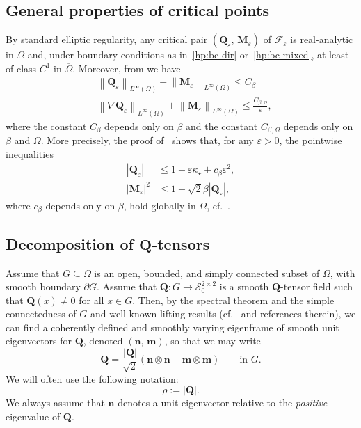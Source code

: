 \documentclass[a4paper, 11pt, twoside, leqno]{article}
\theoremstyle{definition}              %
\theoremstyle{remark}                  %
\newcommand{\abs}[1]{\left| #1 \right|}                             %
\newcommand{\norm}[1]{\left\| #1 \right\|}                          %
\newcommand{\Q}{\mathbf{Q}}
\newcommand{\M}{\mathbf{M}}
\newcommand{\n}{\mathbf{n}}
\newcommand{\m}{\mathbf{m}}
\newcommand{\F}{\mathscr{F}}
\newcommand{\eps}{\varepsilon}
\newcommand{\Sz}{\mathscr{S}_0^{2\times 2}}
\begin{document}
\subsection{General properties of critical points}
By standard elliptic regularity,
any critical pair $(\Q_\eps,\,\M_\eps)$ of $\F_\eps$ is 
real-analytic in $\Omega$ and, under boundary conditions 
as in~\eqref{hp:bc-dir} or~\eqref{hp:bc-mixed}, at least 
of class $C^1$ in $\overline{\Omega}$.
Moreover, from \cite[Lemma~1.6]{CDS1} we have
\begin{align}
    & \norm{\Q_\eps}_{L^\infty(\Omega)} + \norm{\M_\eps}_{L^\infty(\Omega)} \leq C_\beta \label{eq:max-QM} \\
    & \norm{\nabla \Q_\eps}_{L^\infty(\Omega)} + \norm{\M_\eps}_{L^\infty(\Omega)} \leq \frac{C_{\beta,\Omega}}{\eps}\label{eq:max-grad-QM},
\end{align}
where the constant $C_\beta$ depends only on $\beta$ and 
the constant $C_{\beta,\Omega}$ depends only on $\beta$ and $\Omega$. 
More precisely, the proof of~\cite[Lemma~1.6]{CDS1} shows that, 
for any $\eps > 0$, the pointwise inequalities
\begin{align}
    \abs{\Q_\eps} &\leq 1 + \eps \kappa_\star + c_\beta \eps^2, \label{eq:max-princ-rho} \\
    \abs{\M_\eps}^2 &\leq 1 + \sqrt{2}\beta \abs{\Q_\eps} \label{eq:max-princ-M},
\end{align}
where $c_\beta$ depends only on $\beta$, hold globally in $\Omega$, cf.~\cite[Lemma~1.6 and Remark~1.7]{CDS1}.  


\subsection{Decomposition of $\Q$-tensors}\label{sec:dec-Q}
Assume that $G \subseteq \Omega$ is an open, bounded, 
and simply connected subset of $\Omega$, with smooth 
boundary $\partial G$. Assume that $\Q : G \to \Sz$ 
is a smooth $\Q$-tensor field such that $\Q(x) \neq 0$ 
for all $x \in G$. Then, by the spectral theorem and 
the simple connectedness of $G$ and well-known lifting 
results (cf.~\cite{CDS1} and references therein), we can find a coherently 
defined and smoothly varying eigenframe of smooth unit 
eigenvectors for $\Q$, denoted $(\n,\,\m)$, so that we may write
\begin{equation}\label{eq:spectral-thm}
    \Q = \frac{\abs{\Q}}{\sqrt{2}} \left( \n \otimes \n - \m \otimes \m \right) 
    \qquad \mbox{in } G.
\end{equation}
We will often use the following notation:
\[
    \rho := \abs{\Q}.
\]
We always assume that $\n$ denotes a unit eigenvector relative to the \emph{positive} eigenvalue of $\Q$.
\end{document}
